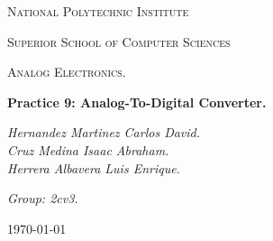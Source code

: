 \begin{titlepage}
	\centering
	{ \huge \scshape National Polytechnic Institute\par}
	{ \Large \scshape  Superior School of Computer Sciences\par }
	\vspace{1cm}
	{\scshape\Large Analog Electronics.\par}
	\vspace{1.5cm}
	{\Huge\bfseries Practice 9: Analog-To-Digital Converter.\par}
	\vspace{2cm}
	{\Large\itshape Hernandez Martinez Carlos David. \\ Cruz Medina Isaac Abraham. \\ 
	Herrera Albavera Luis Enrique.\par} \hfill \break
	{\Large\itshape Group: 2cv3. \par}
	\vfill
	{\large \today\par} 
	\vfill
\end{titlepage}


\tableofcontents 
{}
\pagebreak
